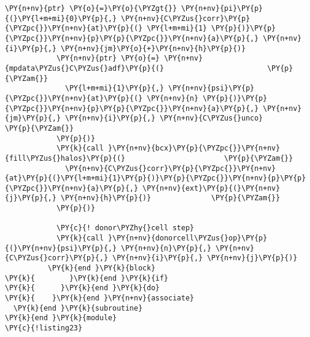 \begin{Verbatim}[commandchars=\\\{\}]
            \PY{n+nv}{ptr} \PY{o}{=}\PY{o}{\PYZgt{}} \PY{n+nv}{pi}\PY{p}{(}\PY{l+m+mi}{0}\PY{p}{,} \PY{n+nv}{C\PYZus{}corr}\PY{p}{\PYZpc{}}\PY{n+nv}{at}\PY{p}{(} \PY{l+m+mi}{1} \PY{p}{)}\PY{p}{\PYZpc{}}\PY{n+nv}{p}\PY{p}{\PYZpc{}}\PY{n+nv}{a}\PY{p}{,} \PY{n+nv}{i}\PY{p}{,} \PY{n+nv}{jm}\PY{o}{+}\PY{n+nv}{h}\PY{p}{)}
            \PY{n+nv}{ptr} \PY{o}{=} \PY{n+nv}{mpdata\PYZus{}C\PYZus{}adf}\PY{p}{(}                        \PY{p}{\PYZam{}}
              \PY{l+m+mi}{1}\PY{p}{,} \PY{n+nv}{psi}\PY{p}{\PYZpc{}}\PY{n+nv}{at}\PY{p}{(} \PY{n+nv}{n} \PY{p}{)}\PY{p}{\PYZpc{}}\PY{n+nv}{p}\PY{p}{\PYZpc{}}\PY{n+nv}{a}\PY{p}{,} \PY{n+nv}{jm}\PY{p}{,} \PY{n+nv}{i}\PY{p}{,} \PY{n+nv}{C\PYZus{}unco}        \PY{p}{\PYZam{}}
            \PY{p}{)}
            \PY{k}{call }\PY{n+nv}{bcx}\PY{p}{\PYZpc{}}\PY{n+nv}{fill\PYZus{}halos}\PY{p}{(}                       \PY{p}{\PYZam{}}
              \PY{n+nv}{C\PYZus{}corr}\PY{p}{\PYZpc{}}\PY{n+nv}{at}\PY{p}{(}\PY{l+m+mi}{1}\PY{p}{)}\PY{p}{\PYZpc{}}\PY{n+nv}{p}\PY{p}{\PYZpc{}}\PY{n+nv}{a}\PY{p}{,} \PY{n+nv}{ext}\PY{p}{(}\PY{n+nv}{j}\PY{p}{,} \PY{n+nv}{h}\PY{p}{)}              \PY{p}{\PYZam{}}
            \PY{p}{)}

            \PY{c}{! donor\PYZhy{}cell step}
            \PY{k}{call }\PY{n+nv}{donorcell\PYZus{}op}\PY{p}{(}\PY{n+nv}{psi}\PY{p}{,} \PY{n+nv}{n}\PY{p}{,} \PY{n+nv}{C\PYZus{}corr}\PY{p}{,} \PY{n+nv}{i}\PY{p}{,} \PY{n+nv}{j}\PY{p}{)} 
          \PY{k}{end }\PY{k}{block}
\PY{k}{        }\PY{k}{end }\PY{k}{if}
\PY{k}{      }\PY{k}{end }\PY{k}{do}
\PY{k}{    }\PY{k}{end }\PY{n+nv}{associate}
  \PY{k}{end }\PY{k}{subroutine}
\PY{k}{end }\PY{k}{module}
\PY{c}{!listing23}
\end{Verbatim}
